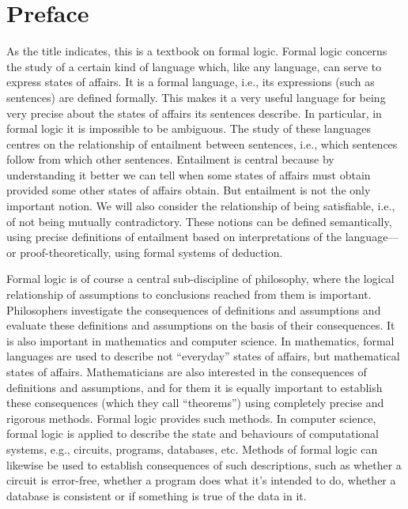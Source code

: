 \chapter{Preface}

As the title indicates, this is a textbook on formal logic.  Formal logic concerns the study of a certain kind of language which, like any language, can serve to express states of affairs.  It is a formal language, i.e., its expressions (such as sentences) are defined formally.  This makes it a very useful language for being very precise about the states of affairs its sentences describe. In particular, in formal logic it is impossible to be ambiguous. The study of these languages centres on the relationship of entailment between sentences, i.e., which sentences follow from which other sentences.  Entailment is central because by understanding it better we can tell when some states of affairs must obtain provided some other states of affairs obtain.  But entailment is not the only important notion. We will also consider the relationship of being satisfiable, i.e., of not being mutually contradictory.  These notions can be defined semantically, using precise definitions of entailment based on interpretations of the language---or proof-theoretically, using formal systems of deduction.

Formal logic is of course a central sub-discipline of philosophy, where the logical relationship of assumptions to conclusions reached from them is important.  Philosophers investigate the consequences of definitions and assumptions and evaluate these definitions and assumptions on the basis of their consequences. It is also important in mathematics and computer science. In mathematics, formal languages are used to describe not ``everyday'' states of affairs, but mathematical states of affairs. Mathematicians are also interested in the consequences of definitions and assumptions, and for them it is equally important to establish these consequences (which they call ``theorems'') using completely precise and rigorous methods. Formal logic provides such methods.  In computer science, formal logic is applied to describe the state and behaviours of computational systems, e.g., circuits, programs, databases, etc.  Methods of formal logic can likewise be used to establish consequences of such descriptions, such as whether a circuit is error-free, whether a program does what it's intended to do, whether a database is consistent or if something is true of the data in it.

